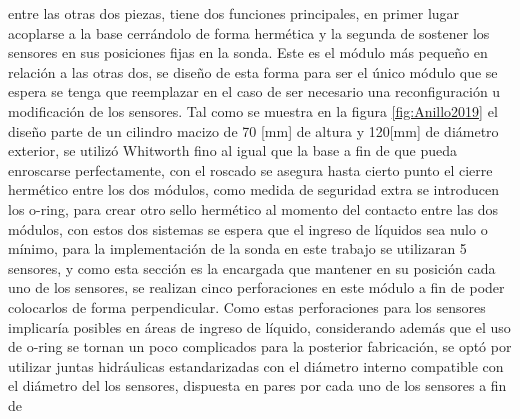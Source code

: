 \begin{itemize}
    entre las otras dos piezas, tiene dos funciones principales, en primer lugar acoplarse a la base cerr\'andolo de forma herm\'etica y la segunda de sostener los sensores en sus posiciones fijas en la sonda. Este es el m\'odulo m\'as peque\~no en relaci\'on a las otras dos, se dise\~no de esta forma para ser el \'unico m\'odulo que se espera se tenga que reemplazar en el caso de ser necesario una reconfiguraci\'on u modificaci\'on de los sensores. Tal como se muestra en la figura \ref{fig:Anillo2019} el dise\~no parte de un cilindro macizo de 70 [mm] de altura y 120[mm] de di\'ametro exterior, se utiliz\'o Whitworth fino al igual que la base a fin de que pueda enroscarse  perfectamente, con el roscado se asegura hasta cierto punto el cierre herm\'etico entre los dos m\'odulos, como medida de seguridad extra se introducen los o-ring, para crear otro  sello hermético al momento del contacto entre las dos m\'odulos, con estos dos sistemas se espera que el ingreso de l\'iquidos sea nulo o m\'inimo, para la implementaci\'on de la sonda en este trabajo se utilizaran 5 sensores, y como esta secci\'on es la encargada que mantener en su posici\'on cada uno de los sensores, se realizan cinco perforaciones en este m\'odulo a fin de poder colocarlos de forma perpendicular. Como estas perforaciones para los sensores implicar\'ia posibles en \'areas de ingreso de l\'iquido, considerando adem\'as que el uso de o-ring se tornan un poco complicados para la posterior fabricaci\'on, se opt\'o por utilizar juntas hidr\'aulicas estandarizadas con el di\'ametro interno compatible con el di\'ametro del los sensores, dispuesta en pares por cada uno de los sensores a fin de 
    

\end{itemize}
